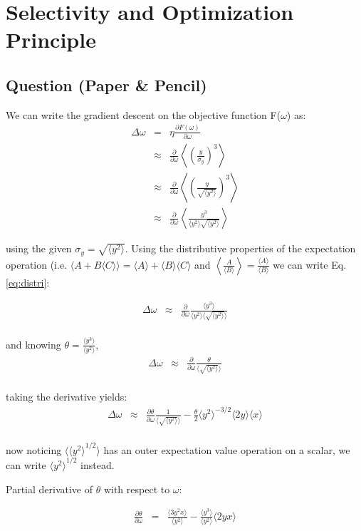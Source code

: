 \section{Selectivity and Optimization Principle}
\subsection{Question (Paper \& Pencil)} 

We can write the gradient descent on the objective function F($\omega$) as:
\begin{eqnarray}
\Delta \omega&=&\eta \frac{\partial F(\omega)}{\partial \omega} \\
&\approx&\frac{\partial }{\partial \omega} \left\langle \left(\frac{y}{\sigma_y}\right)^3 \right\rangle \\
&\approx&\frac{\partial }{\partial \omega} \left\langle \left(\frac{y}{\sqrt{\langle y^2\rangle}}\right)^3 \right\rangle \\
&\approx&\frac{\partial }{\partial \omega} \left\langle \frac{y^3}{\langle y^2\rangle  \sqrt{\langle y^2\rangle}} \right\rangle
\end{eqnarray}

using the given $\sigma_y = \sqrt{\langle y^2\rangle}$. Using the distributive properties of the expectation operation (i.e. $\langle A + B \langle C\rangle\rangle = \langle A  \rangle + \langle B\rangle \langle C\rangle$ and $\left\langle \frac{A}{\langle B\rangle}\right\rangle = \frac{\langle A  \rangle}{\langle B  \rangle}$ we can write Eq. \ref{eq:distri}: 

\begin{eqnarray}
\Delta \omega&\approx& \frac{\partial }{\partial \omega}  \frac{\langle y^3 \rangle}{\langle y^2 \rangle \langle \sqrt{\langle y^2 \rangle}\rangle}  \label{eq:distri}\\
\end{eqnarray}

and knowing $\theta = \frac{\langle y^3\rangle}{\langle y^2\rangle}$, 
\begin{eqnarray}
\Delta \omega&\approx& \frac{\partial }{\partial \omega}  \frac{\theta}{ \langle \sqrt{\langle y^2 \rangle}\rangle} \\
\end{eqnarray}

taking the derivative yields: 
\begin{eqnarray}
\Delta \omega&\approx& \frac{\partial \theta}{\partial \omega}  \frac{1}{ \langle \sqrt{\langle y^2 \rangle}\rangle} -  \frac{\theta}{2}  {\langle y^2 \rangle}^{-3/2} \langle 2y\rangle \langle x \rangle \\
\end{eqnarray}

now noticing $\langle {\langle y^2 \rangle}^{1/2} \rangle$ has an outer expectation value operation on a scalar, we can write $ {\langle y^2 \rangle}^{1/2} $ instead.

Partial derivative of $\theta$ with respect to $\omega$:

\begin{eqnarray}
\frac{\partial \theta}{\partial \omega} &=& \frac{\langle 3y^2 x\rangle}{\langle y^2 \rangle}  - \frac{\langle y^3\rangle}{\langle y^2\rangle} \langle 2yx\rangle
\end{eqnarray}
